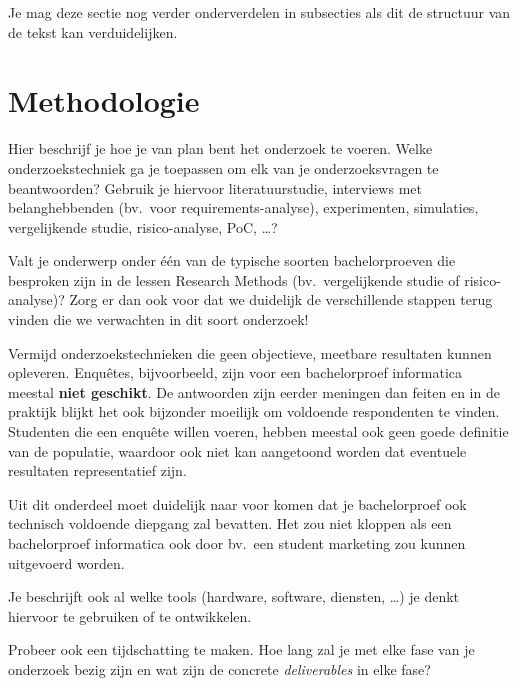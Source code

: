 
Je mag deze sectie nog verder onderverdelen in subsecties als dit de structuur van de tekst kan verduidelijken.

\section{Methodologie}%
\label{sec:methodologie}

Hier beschrijf je hoe je van plan bent het onderzoek te voeren. Welke onderzoekstechniek ga je toepassen om elk van je onderzoeksvragen te beantwoorden? Gebruik je hiervoor literatuurstudie, interviews met belanghebbenden (bv.~voor requirements-analyse), experimenten, simulaties, vergelijkende studie, risico-analyse, PoC, \ldots?

Valt je onderwerp onder één van de typische soorten bachelorproeven die besproken zijn in de lessen Research Methods (bv.\ vergelijkende studie of risico-analyse)? Zorg er dan ook voor dat we duidelijk de verschillende stappen terug vinden die we verwachten in dit soort onderzoek!

Vermijd onderzoekstechnieken die geen objectieve, meetbare resultaten kunnen opleveren. Enquêtes, bijvoorbeeld, zijn voor een bachelorproef informatica meestal \textbf{niet geschikt}. De antwoorden zijn eerder meningen dan feiten en in de praktijk blijkt het ook bijzonder moeilijk om voldoende respondenten te vinden. Studenten die een enquête willen voeren, hebben meestal ook geen goede definitie van de populatie, waardoor ook niet kan aangetoond worden dat eventuele resultaten representatief zijn.

Uit dit onderdeel moet duidelijk naar voor komen dat je bachelorproef ook technisch voldoen\-de diepgang zal bevatten. Het zou niet kloppen als een bachelorproef informatica ook door bv.\ een student marketing zou kunnen uitgevoerd worden.

Je beschrijft ook al welke tools (hardware, software, diensten, \ldots) je denkt hiervoor te gebruiken of te ontwikkelen.

Probeer ook een tijdschatting te maken. Hoe lang zal je met elke fase van je onderzoek bezig zijn en wat zijn de concrete \emph{deliverables} in elke fase?

